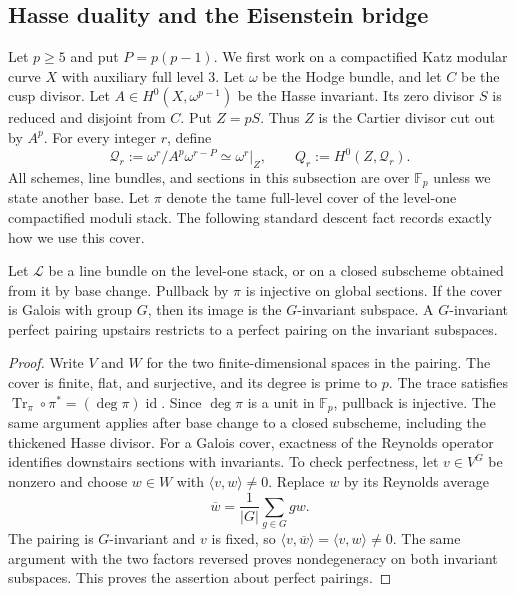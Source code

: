 \subsection{Hasse duality and the Eisenstein bridge}

Let $p\geq5$ and put $P=p(p-1)$.  We first work on a compactified Katz
modular curve $X$ with auxiliary full level $3$.  Let $\omega$ be the Hodge
bundle, and let $C$ be the cusp divisor.  Let
$A\in H^0(X,\omega^{p-1})$ be the Hasse invariant.  Its zero divisor $S$ is
reduced and disjoint from $C$.  Put $Z=pS$.  Thus $Z$ is the Cartier divisor
cut out by $A^p$.  For every integer $r$, define
\[
 \mathcal Q_r:=\omega^r/A^p\omega^{r-P}
              \simeq \omega^r\vert_Z,
 \qquad Q_r:=H^0(Z,\mathcal Q_r).
\]
All schemes, line bundles, and sections in this subsection are over
$\mathbb F_p$ unless we state another base.  Let $\pi$ denote the tame
full-level cover of the level-one compactified moduli stack.  The following
standard descent fact records exactly how we use this cover.

\begin{lemma}\label{lem:tame-pullback-faithful}
Let $\mathcal L$ be a line bundle on the level-one stack, or on a closed
subscheme obtained from it by base change.  Pullback by $\pi$ is injective on
global sections.  If the cover is Galois with group $G$, then its image is the
$G$-invariant subspace.  A $G$-invariant perfect pairing upstairs restricts
to a perfect pairing on the invariant subspaces.
\end{lemma}

\begin{proof}
Write $V$ and $W$ for the two finite-dimensional spaces in the pairing.
The cover is finite, flat, and surjective, and its degree is prime to $p$.
The trace satisfies
$\operatorname{Tr}_{\pi}\circ\pi^*=(\deg\pi)\operatorname{id}$.
Since $\deg\pi$ is a unit in $\mathbb F_p$, pullback is injective.  The same
argument applies after base change to a closed subscheme, including the
thickened Hasse divisor.  For a Galois cover, exactness of the Reynolds
operator identifies downstairs sections with invariants.  To check
perfectness, let $v\in V^G$ be nonzero and choose $w\in W$ with
$\langle v,w\rangle\ne0$.  Replace $w$ by its Reynolds average
\[
 \overline w=\frac{1}{|G|}\sum_{g\in G}gw.
\]
The pairing is $G$-invariant and $v$ is fixed, so
$\langle v,\overline w\rangle=\langle v,w\rangle\ne0$.  The same argument
with the two factors reversed proves nondegeneracy on both invariant
subspaces.  This proves the assertion about perfect pairings.
\end{proof}

